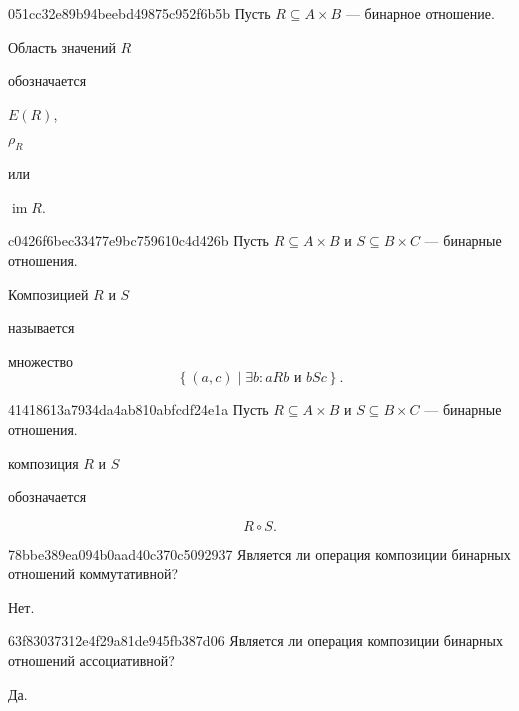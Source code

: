 \begin{note}{051cc32e89b94beebd49875c952f6b5b}
    Пусть \({ R \subseteq A \times B }\) --- бинарное отношение.
    \begin{icloze}{2}Область значений \({ R }\)\end{icloze} обозначается \begin{icloze}{1}\({ E(R) }\),\end{icloze} \begin{icloze}{1}\({ \rho_{R} }\)\end{icloze} или \begin{icloze}{1}\({ \operatorname{im} R }\).\end{icloze}
\end{note}

\begin{note}{c0426f6bec33477e9bc759610c4d426b}
    Пусть \({ R \subseteq A \times B }\) и \({ S \subseteq B \times C }\) --- бинарные отношения.
    \begin{icloze}{2}Композицией \({ R }\) и \({ S }\)\end{icloze} называется
    \begin{icloze}{1}
        множество
        \[
            \left\{ (a, c) \mid \exists b : aRb \text{ и } bSc \right\}.
        \]
    \end{icloze}
\end{note}

\begin{note}{41418613a7934da4ab810abfcdf24e1a}
    Пусть \({ R \subseteq A \times B }\) и \({ S \subseteq B \times C }\) --- бинарные отношения.
    \begin{icloze}{2}композиция \({ R }\) и \({ S }\)\end{icloze} обозначается
    \begin{icloze}{1}
        \[
            R \circ S.
        \]
    \end{icloze}
\end{note}

\begin{note}{78bbe389ea094b0aad40c370c5092937}
    Является ли операция композиции бинарных отношений коммутативной?

    \begin{cloze}{1}
        Нет.
    \end{cloze}
\end{note}

\begin{note}{63f83037312e4f29a81de945fb387d06}
    Является ли операция композиции бинарных отношений ассоциативной?

    \begin{cloze}{1}
        Да.
    \end{cloze}
\end{note}

